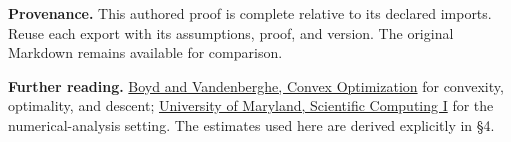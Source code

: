 \documentclass[preprint,12pt,aps,pra,showkeys,amsmath,amssymb,superscriptaddress,floatfix]{revtex4-2}
\theoremstyle{definition}
\theoremstyle{remark}
\begin{document}
\par\medskip\begingroup\small\linespread{1.0}\selectfont\noindent\textbf{Provenance.} This authored proof is complete relative to its declared imports. Reuse
each export with its assumptions, proof, and version. The original
Markdown remains available for comparison.
\par\endgroup

\par\smallskip\begingroup\small\linespread{1.0}\selectfont\noindent\textbf{Further reading.} \href{https://web.stanford.edu/~boyd/cvxbook/}{Boyd and Vandenberghe,
Convex Optimization} for convexity, optimality, and descent;
\href{https://www.math.umd.edu/~mariakc/Spring2020Class.html}{University
of Maryland, Scientific Computing I} for the numerical-analysis setting.
The estimates used here are derived explicitly in §4.\par\endgroup
\end{document}

